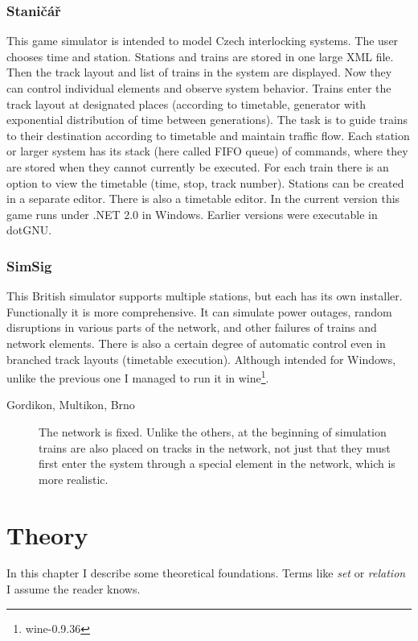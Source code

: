 \documentclass[english]{cls/fitthesis}
\begin{document}
    \subsection*{Staničář}
      This game simulator is intended to model Czech interlocking systems.
      The user chooses time and station. Stations and trains are stored in one large XML file.
      Then the track layout and list of trains in the system are displayed.
      Now they can control individual elements and observe system behavior.
      Trains enter the track layout at designated places (according to timetable, generator with exponential
      distribution of time between generations).
      The task is to guide trains to their destination according to timetable and maintain traffic flow.
      Each station or larger system has its stack (here called FIFO queue) of commands, where
      they are stored when they cannot currently be executed. For each train there is an option to view the timetable
      (time, stop, track number). Stations can be created in a separate editor.
      There is also a timetable editor.
      In the current version this game runs under .NET 2.0 in Windows. Earlier versions were executable in dotGNU.
    \subsection*{SimSig}
      This British simulator supports multiple stations, but each has its own installer.
      Functionally it is more comprehensive. It can simulate power outages, random disruptions in various parts of the network,
      and other failures of trains and network elements. There is also
      a certain degree of automatic control even in branched track layouts (timetable execution).
      Although intended for Windows, unlike the previous one I managed to run it
      in wine\footnote{wine-0.9.36}.
    \begin{description}
      \item[Gordikon, Multikon, Brno] The network is fixed.
        Unlike the others, at the beginning of simulation trains are also placed on tracks in the network,
        not just that they must first enter the system through a special element in the network, which is more realistic.
    \end{description}
\chapter{Theory}
In this chapter I describe some theoretical foundations. Terms like \emph{set} or \emph{relation} I assume the reader knows.
\end{document}
